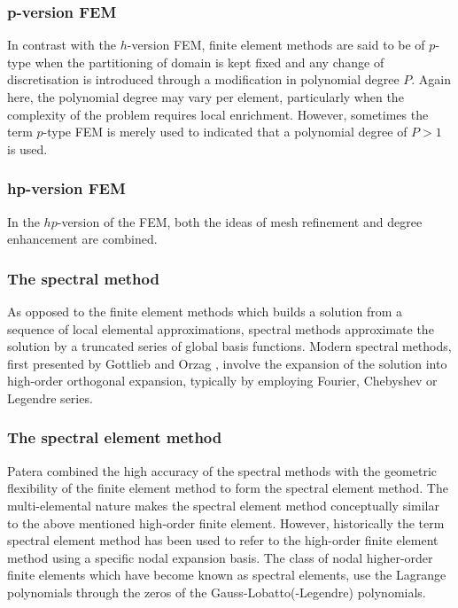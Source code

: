 \subsubsection{p-version FEM}

In contrast with the $h$-version FEM, finite element methods are said to be of
$p$-type when the partitioning of domain is kept fixed and any change of
discretisation is introduced through a modification in polynomial degree $P$.
Again here, the polynomial degree may vary per element, particularly when the
complexity of the problem requires local enrichment. However, sometimes the term
$p$-type FEM is merely used to indicated that a polynomial degree of
$P>1$ is used.

\subsubsection{hp-version FEM}

In the $hp$-version of the FEM, both the ideas of mesh refinement and degree
enhancement are combined.

\subsubsection{The spectral method}

As opposed to the finite element methods which builds a solution from a sequence
of local elemental approximations, spectral methods approximate the solution by
a truncated series of global basis functions. Modern spectral methods, first
presented by Gottlieb and Orzag \cite{GoOr77}, involve the expansion of the
solution into high-order orthogonal expansion, typically by employing Fourier,
Chebyshev or Legendre series.

\subsubsection{The spectral element method}

Patera \cite{Pa84} combined the high accuracy of the spectral methods with the
geometric flexibility of the finite element method to form the spectral element
method. The multi-elemental nature makes the spectral element method
conceptually similar to the above mentioned high-order finite element. However,
historically the term spectral element method has been used to refer to the
high-order finite element method using a specific nodal expansion basis. The
class of nodal higher-order finite elements which have become known as spectral
elements, use the Lagrange polynomials through the zeros of the
Gauss-Lobatto(-Legendre) polynomials.

